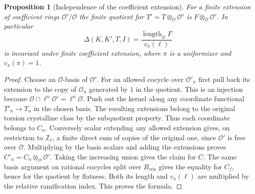 \documentclass[a4paper,11pt]{article}
\newtheorem{proposition}{Proposition}[section]
\theoremstyle{definition}
\theoremstyle{remark}
\newcommand{\ZZ}{\mathbb Z}\newcommand{\ord}{\operatorname{ord}}
\numberwithin{equation}{section}
\begin{document}
\begin{proposition}[Independence of the coefficient extension]
\leavevmode\label{prop:coeffdefect732}
For a finite extension of coefficient rings \(\mathcal O'/\mathcal O\)
the finite quotient for \(T'=T\otimes_\mathcal O\mathcal O'\) is
\(F\otimes_\mathcal O\mathcal O'\). In particular
\[
      \Delta(K,K',T,I)=
       \frac{\operatorname{length}_{\mathcal O}F}{v_\pi(\ell)}
\]
is invariant under finite coefficient extension, where
\(\pi\) is a uniformizer and \(v_\pi(\pi)=1\).
\end{proposition}
\begin{proof}
Choose an \(\mathcal O\)-basis of \(\mathcal O'\). For an allowed
cocycle over \(\mathcal O'_n\) first pull back its extension to the
copy of \(\mathcal O_n\) generated by \(1\) in the quotient. This
is an injection because \(\mathcal O\cap\ell^n\mathcal O'
=\ell^n\mathcal O\). Push out the kernel along any coordinate
functional \(T'_n\to T_n\) in the chosen basis. The resulting
extensions belong to the original torsion crystalline class by
the subquotient property. Thus each coordinate belongs to \(C_n\).
Conversely scalar extending any allowed extension gives, on
restriction to \(\ZZ_\ell\), a finite direct sum of copies of the
original one, since \(\mathcal O'\) is free over \(\mathcal O\).
Multiplying by the basis scalars and adding the extensions proves
\(C'_n=C_n\otimes_\mathcal O\mathcal O'\).
Taking the increasing union gives the claim for \(C\). The same
basis argument on rational cocycles split over \(B_{\mathrm{cris}}\)
gives the equality for \(C_f\), hence for the quotient by flatness.
Both its length and \(v_\pi(\ell)\) are multiplied by the relative
ramification index. This proves the formula.
\end{proof}
\end{document}
